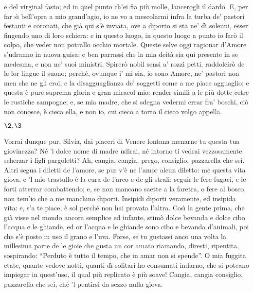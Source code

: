 \documentclass{book}
\begin{document}
	e del virginal fasto; ed in quel punto
	ch'ei fia pi\`u molle, lancerogli il dardo.
	E, per far s\`{\i} bell'opra a mio grand'agio,
	io ne vo a mescolarmi infra la turba
	de' pastori festanti e coronati,
	che gi\`a qui s'\`e inviata, ove a diporto
	si sta ne' d\`{\i} solenni, esser fingendo
	uno di loro schiera: e in questo luogo,
	in questo luogo a punto io far\`o il colpo,
	che veder non potrallo occhio mortale.
	Queste selve oggi ragionar d'Amore
	s'udranno in nuova guisa; e ben parrassi
	che la mia deit\`a sia qui presente
	in se medesma, e non ne' suoi ministri.
	Spirer\`o nobil sensi a' rozzi petti,
	raddolcir\`o de le lor lingue il suono;
	perch\'e, ovunque i' mi sia, io sono Amore,
	ne' pastori non men che ne gli eroi,
	e la disagguaglianza de' soggetti
	come a me piace agguaglio; e questa \`e pure
	suprema gloria e gran miracol mio:
	render simili a le pi\`u dotte cetre
	le rustiche sampogne; e, se mia madre,
	che si sdegna vedermi errar fra' boschi,
	ci\`o non conosce, \`e cieca ella, e non io,
	cui cieco a torto il cieco volgo appella.

\newpage

\Atto

\Scena
\(\2, \3\)

\2 Vorrai dunque pur, Silvia,
	dai piaceri di Venere lontana
	menarne tu questa tua giovinezza?
	N\'e 'l dolce nome di madre udirai,
	n\'e intorno ti vedrai vezzosamente
	scherzar i figli pargoletti? Ah, cangia,
	cangia, prego, consiglio,
	pazzarella che sei.
\3 Altri segua i diletti de l'amore,
	se pur v'\`e ne l'amor alcun diletto:
	me questa vita giova, e 'l mio trastullo
	\`e la cura de l'arco e de gli strali;
	seguir le fere fugaci, e le forti
	atterrar combattendo; e, se non mancano
	saette a la faretra, o fere al bosco,
	non tem'io che a me manchino diporti.
	\2 Insipidi diporti veramente,
	ed insipida vita: e, s'a te piace,
	\`e sol perch\'e non hai provata l'altra.
	Cos\`{\i} la gente prima, che gi\`a visse
	nel mondo ancora semplice ed infante,
	stim\`o dolce bevanda e dolce cibo
	l'acqua e le ghiande, ed or l'acqua e le ghiande
	sono cibo e bevanda d'animali,
	poi che s'\`e posto in uso il grano e l'uva.
	Forse, se tu gustassi anco una volta
	la millesima parte de le gioie
	che gusta un cor amato riamando,
	diresti, ripentita, sospirando:
	``Perduto \`e tutto il tempo,
	che in amar non si spende''.
	O mia fuggita etate,
	quante vedove notti,
	quanti d\`{\i} solitari
	ho consumati indarno,
	che si poteano impiegar in quest'uso,
	il qual pi\`u replicato \`e pi\`u soave!
	Cangia, cangia consiglio,
	pazzarella che sei,
	ch\'e 'l pentirsi da sezzo nulla giova.
\end{document}
